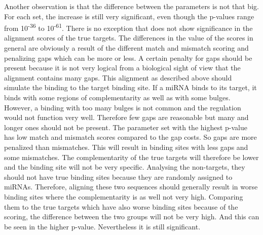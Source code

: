 \documentclass[11pt, a4paper, oneside]{book}
\begin{document}
Another observation is that the difference between the parameters is not that big. For each set, the increase is still very significant, even though the p-values range from 10\textsuperscript{-36} to 10\textsuperscript{-61}. There is no exception that does not show significance in the alignment scores of the true targets. The differences in the value of the scores in general are obviously a result of the different match and mismatch scoring and penalizing gaps which can be more or less. A certain penalty for gaps should be present because it is not very logical from a biological sight of view that the alignment contains many gaps. This alignment as described above should simulate the binding to the target binding site. If a miRNA binds to its target, it binds with some regions of complementarity as well as with some bulges. However, a binding with too many bulges is not common and the regulation would not function very well. Therefore few gaps are reasonable but many and longer ones should not be present.
The parameter set with the highest p-value has low match and mismatch scores compared to the gap costs. So gaps are more penalized than mismatches. This will result in binding sites with less gaps and some mismatches. The complementarity of the true targets will therefore be lower and the binding site will not be very specific. Analysing the non-targets, they should not have true binding sites because they are randomly assigned to miRNAs. Therefore, aligning these two sequences should generally result in worse binding sites where the complementarity is as well not very high. Comparing them to the true targets which have also worse binding sites because of the scoring, the difference between the two groups will not be very high. And this can be seen in the higher p-value. Nevertheless it is still significant. \\
\end{document}
